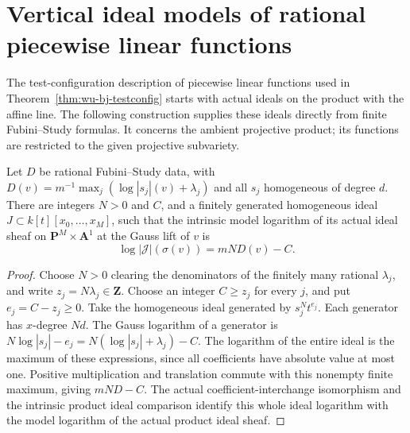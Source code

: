 \section{Vertical ideal models of rational piecewise linear functions}

The test-configuration description of piecewise linear functions used in
Theorem~\ref{thm:wu-bj-testconfig} starts with actual ideals on the product with the
affine line.  The following construction supplies these ideals directly from
finite Fubini--Study formulas.  It concerns the ambient projective product;
its functions are restricted to the given projective subvariety.

\begin{lemma}
\label{lem:pl-fs-product-ideal}
\leanok
Let $D$ be rational Fubini--Study data, with
$D(v)=m^{-1}\max_j(\log|s_j|(v)+\lambda_j)$ and all $s_j$ homogeneous of
degree $d$.  There are integers $N>0$ and $C$, and a finitely generated
homogeneous ideal $J\subset k[t][x_0,\ldots,x_M]$, such that the intrinsic
model logarithm of its actual ideal sheaf on $\mathbf P^M\times\mathbf A^1$
at the Gauss lift of $v$ is
\[
 \log|\mathcal J|(\sigma(v))=mN D(v)-C.
\]
\end{lemma}
\begin{proof}
Choose $N>0$ clearing the denominators of the finitely many rational
$\lambda_j$, and write $z_j=N\lambda_j\in\mathbf Z$.  Choose an integer
$C\ge z_j$ for every $j$, and put $e_j=C-z_j\ge0$.  Take the homogeneous
ideal generated by $s_j^Nt^{e_j}$.  Each generator has $x$-degree $Nd$.
The Gauss logarithm of a generator is
$N\log|s_j|-e_j=N(\log|s_j|+\lambda_j)-C$.  The logarithm of the entire
ideal is the maximum of these expressions, since all coefficients have
absolute value at most one.  Positive multiplication and translation
commute with this nonempty finite maximum, giving $mND-C$.
The actual coefficient-interchange isomorphism and the intrinsic product
ideal comparison identify this whole ideal logarithm with the model
logarithm of the actual product ideal sheaf.
\end{proof}

